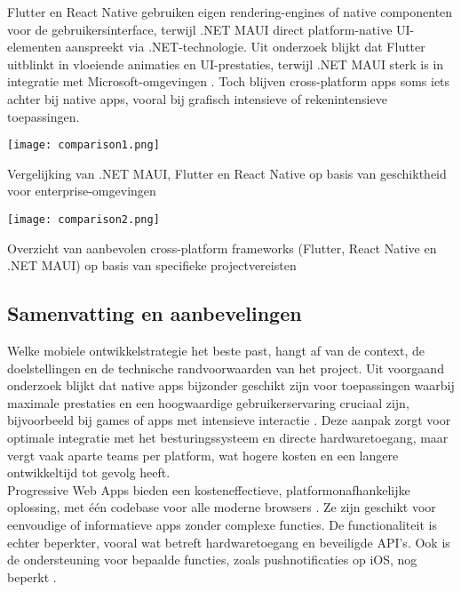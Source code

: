 Flutter en React Native gebruiken eigen rendering-engines of native componenten voor de gebruikersinterface, terwijl .NET MAUI direct platform-native UI-elementen aanspreekt via .NET-technologie. Uit onderzoek blijkt dat Flutter uitblinkt in vloeiende animaties en UI-prestaties, terwijl .NET MAUI sterk is in integratie met Microsoft-omgevingen \autocite{Gajjam2025}. Toch blijven cross-platform apps soms iets achter bij native apps, vooral bij grafisch intensieve of rekenintensieve toepassingen.

\begin{table}[h]
    \centering
    \texttt{[image: comparison1.png]}
    \caption[Integratie]{Vergelijking van .NET MAUI, Flutter en React Native op basis van geschiktheid voor enterprise-omgevingen \autocite{Gajjam2025}}
    \label{fig:vergelijking}
\end{table}

\begin{table}[h]
    \centering
    \texttt{[image: comparison2.png]}
    \caption[Frameworkkeuze]{Overzicht van aanbevolen cross-platform frameworks (Flutter, React Native en .NET MAUI) op basis van specifieke projectvereisten \autocite{Gajjam2025}}
    \label{tab:frameworkkeuze}
\end{table}

\subsection{Samenvatting en aanbevelingen}
Welke mobiele ontwikkelstrategie het beste past, hangt af van de context, de doelstellingen en de technische randvoorwaarden van het project. Uit voorgaand onderzoek blijkt dat native apps bijzonder geschikt zijn voor toepassingen waarbij maximale prestaties en een hoogwaardige gebruikerservaring cruciaal zijn, bijvoorbeeld bij games of apps met intensieve interactie \autocite{Singh2024, Gillis2022}. Deze aanpak zorgt voor optimale integratie met het besturingssysteem en directe hardwaretoegang, maar vergt vaak aparte teams per platform, wat hogere kosten en een langere ontwikkeltijd tot gevolg heeft.\\

Progressive Web Apps bieden een kosteneffectieve, platformonafhankelijke oplossing, met één codebase voor alle moderne browsers \autocite{Hendriksen2020, Research2024}. Ze zijn geschikt voor eenvoudige of informatieve apps zonder complexe functies. De functionaliteit is echter beperkter, vooral wat betreft hardwaretoegang en beveiligde API’s. Ook is de ondersteuning voor bepaalde functies, zoals pushnotificaties op iOS, nog beperkt \autocite{Schoemaker2019}.\\

